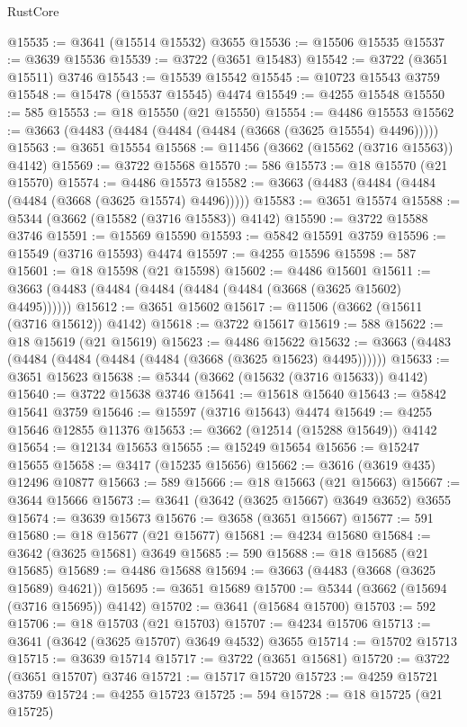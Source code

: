 \begin{lexlean}{RustCore}
\begin{coremodule}
@15535 := @3641 (@15514 @15532) @3655
@15536 := @15506 @15535
@15537 := @3639 @15536
@15539 := @3722 (@3651 @15483)
@15542 := @3722 (@3651 @15511) @3746
@15543 := @15539 @15542
@15545 := @10723 @15543 @3759
@15548 := @15478 (@15537 @15545) @4474
@15549 := @4255 @15548
@15550 := 585
@15553 := @18 @15550 (@21 @15550)
@15554 := @4486 @15553
@15562 := @3663 (@4483 (@4484 (@4484 (@4484 (@3668 (@3625 @15554) @4496)))))
@15563 := @3651 @15554
@15568 := @11456 (@3662 (@15562 (@3716 @15563)) @4142)
@15569 := @3722 @15568
@15570 := 586
@15573 := @18 @15570 (@21 @15570)
@15574 := @4486 @15573
@15582 := @3663 (@4483 (@4484 (@4484 (@4484 (@3668 (@3625 @15574) @4496)))))
@15583 := @3651 @15574
@15588 := @5344 (@3662 (@15582 (@3716 @15583)) @4142)
@15590 := @3722 @15588 @3746
@15591 := @15569 @15590
@15593 := @5842 @15591 @3759
@15596 := @15549 (@3716 @15593) @4474
@15597 := @4255 @15596
@15598 := 587
@15601 := @18 @15598 (@21 @15598)
@15602 := @4486 @15601
@15611 := @3663 (@4483 (@4484 (@4484 (@4484 (@4484 (@3668 (@3625 @15602) @4495))))))
@15612 := @3651 @15602
@15617 := @11506 (@3662 (@15611 (@3716 @15612)) @4142)
@15618 := @3722 @15617
@15619 := 588
@15622 := @18 @15619 (@21 @15619)
@15623 := @4486 @15622
@15632 := @3663 (@4483 (@4484 (@4484 (@4484 (@4484 (@3668 (@3625 @15623) @4495))))))
@15633 := @3651 @15623
@15638 := @5344 (@3662 (@15632 (@3716 @15633)) @4142)
@15640 := @3722 @15638 @3746
@15641 := @15618 @15640
@15643 := @5842 @15641 @3759
@15646 := @15597 (@3716 @15643) @4474
@15649 := @4255 @15646 @12855 @11376
@15653 := @3662 (@12514 (@15288 @15649)) @4142
@15654 := @12134 @15653
@15655 := @15249 @15654
@15656 := @15247 @15655
@15658 := @3417 (@15235 @15656)
@15662 := @3616 (@3619 @435) @12496 @10877
@15663 := 589
@15666 := @18 @15663 (@21 @15663)
@15667 := @3644 @15666
@15673 := @3641 (@3642 (@3625 @15667) @3649 @3652) @3655
@15674 := @3639 @15673
@15676 := @3658 (@3651 @15667)
@15677 := 591
@15680 := @18 @15677 (@21 @15677)
@15681 := @4234 @15680
@15684 := @3642 (@3625 @15681) @3649
@15685 := 590
@15688 := @18 @15685 (@21 @15685)
@15689 := @4486 @15688
@15694 := @3663 (@4483 (@3668 (@3625 @15689) @4621))
@15695 := @3651 @15689
@15700 := @5344 (@3662 (@15694 (@3716 @15695)) @4142)
@15702 := @3641 (@15684 @15700)
@15703 := 592
@15706 := @18 @15703 (@21 @15703)
@15707 := @4234 @15706
@15713 := @3641 (@3642 (@3625 @15707) @3649 @4532) @3655
@15714 := @15702 @15713
@15715 := @3639 @15714
@15717 := @3722 (@3651 @15681)
@15720 := @3722 (@3651 @15707) @3746
@15721 := @15717 @15720
@15723 := @4259 @15721 @3759
@15724 := @4255 @15723
@15725 := 594
@15728 := @18 @15725 (@21 @15725)

\end{coremodule}
\end{lexlean}
